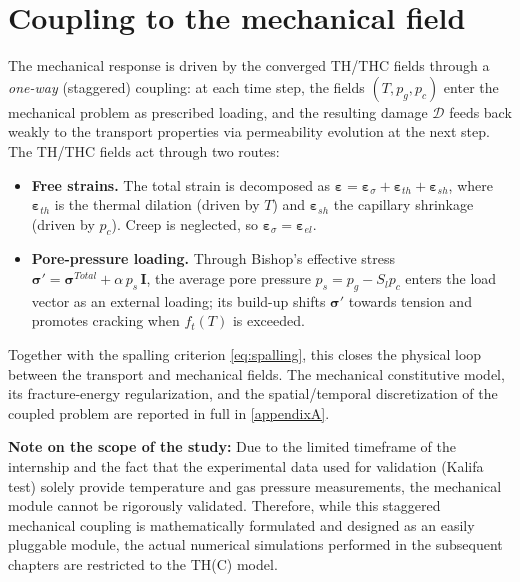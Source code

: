 \section{Coupling to the mechanical field} \label{sec:mech}
The mechanical response is driven by the converged TH/THC fields through a \emph{one-way} (staggered) coupling: at each time step, the fields $(T,p_g,p_c)$ enter the mechanical problem as prescribed loading, and the resulting damage $\mathcal{D}$ feeds back weakly to the transport properties via permeability evolution at the next step. The TH/THC fields act through two routes:
\begin{itemize}
    \item \textbf{Free strains.} The total strain is decomposed as $\boldsymbol{\varepsilon}=\boldsymbol{\varepsilon}_\sigma+\boldsymbol{\varepsilon}_{th}+\boldsymbol{\varepsilon}_{sh}$, where $\boldsymbol{\varepsilon}_{th}$ is the thermal dilation (driven by $T$) and $\boldsymbol{\varepsilon}_{sh}$ the capillary shrinkage (driven by $p_c$). Creep is neglected, so $\boldsymbol{\varepsilon}_\sigma=\boldsymbol{\varepsilon}_{el}$.
    \item \textbf{Pore-pressure loading.} Through Bishop's effective stress $\boldsymbol{\sigma}'=\boldsymbol{\sigma}^{Total}+\alpha\,p_s\,\mathbf{I}$, the average pore pressure $p_s=p_g-S_l p_c$ enters the load vector as an external loading; its build-up shifts $\boldsymbol{\sigma}'$ towards tension and promotes cracking when $f_t(T)$ is exceeded.
\end{itemize}
Together with the spalling criterion \eqref{eq:spalling}, this closes the physical loop between the transport and mechanical fields. The mechanical constitutive model, its fracture-energy regularization, and the spatial/temporal discretization of the coupled problem are reported in full in \cref{appendixA}. 

\textbf{Note on the scope of the study:} Due to the limited timeframe of the internship and the fact that the experimental data used for validation (Kalifa test) solely provide temperature and gas pressure measurements, the mechanical module cannot be rigorously validated. Therefore, while this staggered mechanical coupling is mathematically formulated and designed as an easily pluggable module, the actual numerical simulations performed in the subsequent chapters are restricted to the TH(C) model.

